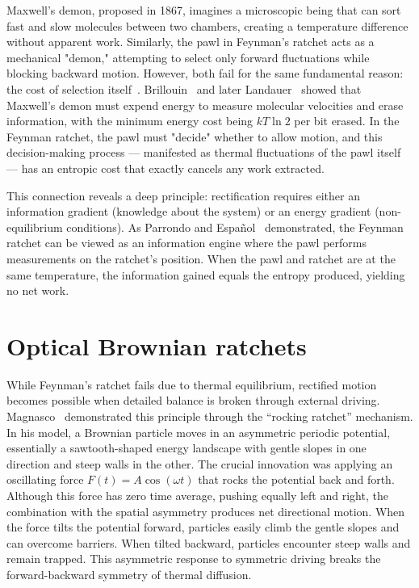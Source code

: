 Maxwell's demon, proposed in 1867, imagines a microscopic being that can sort fast and slow molecules between two chambers, creating a temperature difference without apparent work. Similarly, the pawl in Feynman's ratchet acts as a mechanical "demon," attempting to select only forward fluctuations while blocking backward motion. However, both fail for the same fundamental reason: the cost of selection itself~\cite{maxwell1871theory, maxwell1867letter}.
Brillouin~\cite{brillouin1951maxwell} and later Landauer~\cite{landauer1961irreversibility} showed that Maxwell's demon must expend energy to measure molecular velocities and erase information, with the minimum energy cost being $kT\ln{2}$ per bit erased. In the Feynman ratchet, the pawl must "decide" whether to allow motion, and this decision-making process — manifested as thermal fluctuations of the pawl itself — has an entropic cost that exactly cancels any work extracted.

This connection reveals a deep principle: rectification requires either an information gradient (knowledge about the system) or an energy gradient (non-equilibrium conditions). As Parrondo and Español~\cite{parrondo1996criticism} demonstrated, the Feynman ratchet can be viewed as an information engine where the pawl performs measurements on the ratchet's position. When the pawl and ratchet are at the same temperature, the information gained equals the entropy produced, yielding no net work.


\section{Optical Brownian ratchets}
\label{sct:brownianratchets}

While Feynman's ratchet fails due to thermal equilibrium, rectified motion becomes possible when detailed balance is broken through external driving. Magnasco~\cite{magnasco1993forced} demonstrated this principle through the ``rocking ratchet'' mechanism. In his model, a Brownian particle moves in an asymmetric periodic potential, essentially a sawtooth-shaped energy landscape with gentle slopes in one direction and steep walls in the other.
The crucial innovation was applying an oscillating force $F(t) = A\cos(\omega t)$ that rocks the potential back and forth. Although this force has zero time average, pushing equally left and right, the combination with the spatial asymmetry produces net directional motion. When the force tilts the potential forward, particles easily climb the gentle slopes and can overcome barriers. When tilted backward, particles encounter steep walls and remain trapped. This asymmetric response to symmetric driving breaks the forward-backward symmetry of thermal diffusion.

